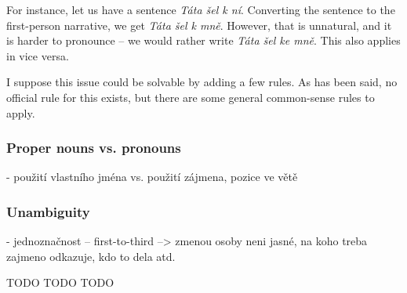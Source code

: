 For instance, let us have a sentence \emph{Táta šel k ní}. Converting the sentence to the first-person narrative, we get \emph{Táta šel k mně}. However, that is unnatural, and it is harder to pronounce -- we would rather write \emph{Táta šel ke mně}. This also applies in vice versa.

I suppose this issue could be solvable by adding a few rules. As has been said, no official rule for this exists, but there are some general common-sense rules to apply.

\subsubsection{Proper nouns vs. pronouns}

- použití vlastního jména vs. použití zájmena, pozice ve větě

\subsubsection{Unambiguity}

- jednoznačnost -- first-to-third --> zmenou osoby neni jasné, na koho treba zajmeno odkazuje, kdo to dela atd.

TODO TODO TODO



